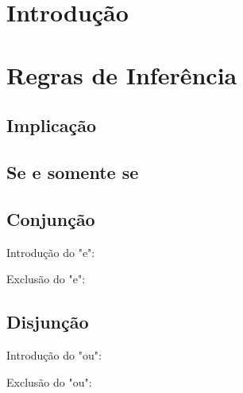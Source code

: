 \section{Introdução}

\section{Regras de Inferência}

\subsection{Implicação} 
\subsection{Se e somente se}

\subsection{Conjunção}

Introdução do "e":
 \begin{prooftree}
\end{prooftree}


Exclusão do "e":
 \begin{prooftree}
\end{prooftree}

\subsection{Disjunção}

Introdução do "ou":
\begin{prooftree}
\end{prooftree}

Exclusão do "ou": 

  \begin{prooftree}
     \end{prooftree}

